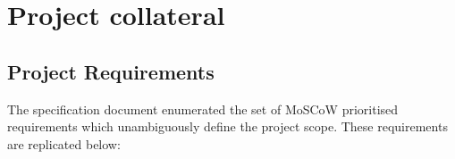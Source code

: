\appendix

\chapter{Project collateral}
\label{ch:project-collateral}

\section{Project Requirements}
\label{sec:project-requirements}

The specification document enumerated the set of MoSCoW prioritised \cite{CaseMethodFastTrack} requirements which unambiguously define the project scope. These requirements are replicated below:

